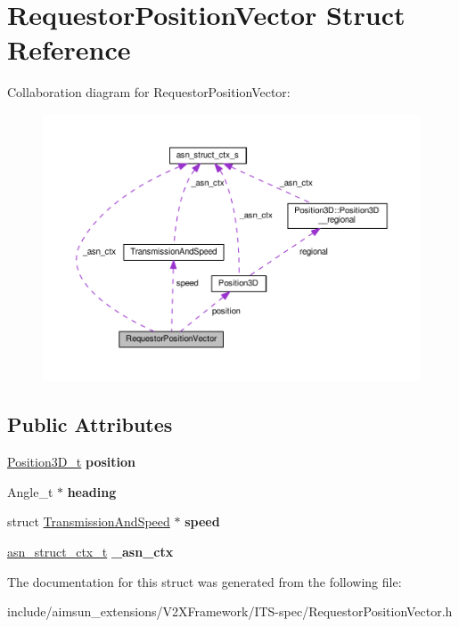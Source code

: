 \hypertarget{structRequestorPositionVector}{}\section{Requestor\+Position\+Vector Struct Reference}
\label{structRequestorPositionVector}


Collaboration diagram for Requestor\+Position\+Vector\+:\nopagebreak
\begin{figure}[H]
\begin{center}
\leavevmode
\includegraphics[width=350pt]{structRequestorPositionVector__coll__graph}
\end{center}
\end{figure}
\subsection*{Public Attributes}
\begin{DoxyCompactItemize}
\item 
\hyperlink{structPosition3D}{Position3\+D\+\_\+t} {\bfseries position}\hypertarget{structRequestorPositionVector_aa9f0fe62c2940c0efdb603ba8e968883}{}\label{structRequestorPositionVector_aa9f0fe62c2940c0efdb603ba8e968883}

\item 
Angle\+\_\+t $\ast$ {\bfseries heading}\hypertarget{structRequestorPositionVector_aae67ffeb244dc93e296f824eb3a6a88f}{}\label{structRequestorPositionVector_aae67ffeb244dc93e296f824eb3a6a88f}

\item 
struct \hyperlink{structTransmissionAndSpeed}{Transmission\+And\+Speed} $\ast$ {\bfseries speed}\hypertarget{structRequestorPositionVector_a74a4ae2f7b2dc44a03e72e8aa25f21aa}{}\label{structRequestorPositionVector_a74a4ae2f7b2dc44a03e72e8aa25f21aa}

\item 
\hyperlink{structasn__struct__ctx__s}{asn\+\_\+struct\+\_\+ctx\+\_\+t} {\bfseries \+\_\+asn\+\_\+ctx}\hypertarget{structRequestorPositionVector_a2dc9f23128fe8c8d06210c040b5f86aa}{}\label{structRequestorPositionVector_a2dc9f23128fe8c8d06210c040b5f86aa}

\end{DoxyCompactItemize}


The documentation for this struct was generated from the following file\+:\begin{DoxyCompactItemize}
\item 
include/aimsun\+\_\+extensions/\+V2\+X\+Framework/\+I\+T\+S-\/spec/Requestor\+Position\+Vector.\+h\end{DoxyCompactItemize}
